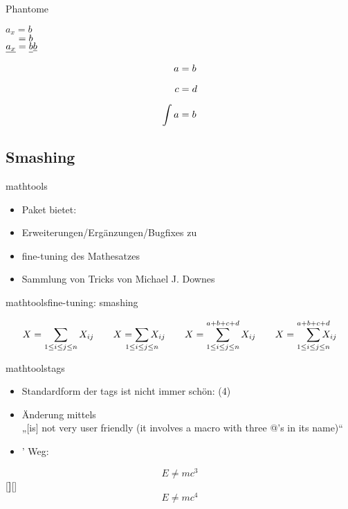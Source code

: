 \documentclass[
	vorläufig=false,
	datum=2017-11-17,
	titel={Mathematiksatz II},
	web=true,
	mo,
	aspectratio=1610,
]{../tex/latexkurs-slides}
\begin{document}
\begin{frame}[fragile]{Phantome}
\begin{LTXexample}[width=.4\textwidth]
$a_x = b$\\
$\hphantom{a_x} = b$\\
$\underline{a_x} = \underline{b\vphantom{a_x}}\underline b$
\end{LTXexample}
\begin{LTXexample}
\begin{align*}
a &= b\\
\vphantom{\int} c &= d\\
\int a &= b
\end{align*}
\end{LTXexample}
\end{frame}


\subsection{Smashing}
\begin{frame}{mathtools}
\begin{itemize}
\item Paket  bietet:
\item Erweiterungen/Ergänzungen/Bugfixes zu 
\item fine-tuning des Mathesatzes
\item Sammlung von Tricks von Michael J. Downes
\end{itemize}
\end{frame}

\begin{frame}[fragile]{mathtools}{fine-tuning: smashing}
\begin{LTXexample}[pos=t]
\[
  X = \sum_{1\le i\le j\le n} X_{ij} \qquad
  X = \sum_{\mathclap{1\le i\le j\le n}} X_{ij} \qquad
  X = \sum_{\mathclap{1\le i\le j\le n}}^{a+b+c+d} X_{ij} \qquad
  X = \smashoperator[r]{\sum_{1\le i\le j\le n}^{a+b+c+d}} X_{ij}
\]
\end{LTXexample}
\end{frame}

\begin{frame}[fragile]{mathtools}{tags}
\begin{itemize}
\item Standardform der tags ist nicht immer schön: (4)
\item Änderung mittels \\%
„[is] not very user friendly (it involves a macro with three @’s in its name)“
\item {}’ Weg:
\end{itemize} 
\begin{LTXexample}[width=.3\textwidth]
\begin{equation}E \neq mc^3\end{equation}
[\textbf]{[}{]}
\begin{equation}E \neq mc^4\end{equation}
\end{LTXexample}
\end{frame}
\end{document}
